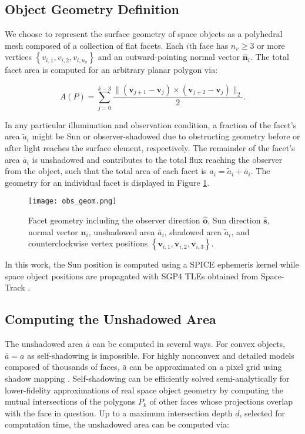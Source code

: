 \documentclass[a4paper,twocolumn]{spaceDebrisC} %
\newcommand{\vctr}[1]{\bm{#1}}
\newcommand{\unitv}[1]{\hat{\vctr{#1}}}
\newcommand{\figmed}[0]{0.35\textwidth}
\begin{document}
\subsection{Object Geometry Definition}

We choose to represent the surface geometry of space objects as a polyhedral mesh composed of a collection of flat facets. Each $i$th face has $n_v \geq 3$ or more vertices $\left\{ v_{i,1}, v_{i,2}, v_{i,n_v} \right\}$ and an outward-pointing normal vector $\unitv{n}_i$. The total facet area is computed for an arbitrary planar polygon via:

\begin{equation} \label{eq:poly_area}
 A(P) = \sum_{j=0}^{k-3} \frac{\| \left( \vctr{v}_{j+1} - \vctr{v}_{j} \right) \times \left( \vctr{v}_{j+2} - \vctr{v}_{j} \right)\|_2}{2}.
 \end{equation} 
 
 In any particular illumination and observation condition, a fraction of the facet's area $\tilde{a}_i$ might be Sun or observer-shadowed due to obstructing geometry before or after light reaches the surface element, respectively. The remainder of the facet's area $\bar{a}_i$ is unshadowed and contributes to the total flux reaching the observer from the object, such that the total area of each facet is $a_i = \tilde{a}_i + \bar{a}_i$. The geometry for an individual facet is displayed in Figure \ref{fig:facet_geom}.

\begin{figure}[H]
  \centering
  \texttt{[image: obs\_geom.png]}
  \caption{Facet geometry including the observer direction $\unitv{o}$, Sun direction $\unitv{s}$, normal vector $\unitv{n}_i$, unshadowed area $\bar{a}_i$, shadowed area $\tilde{a}_i$, and counterclockwise vertex positions $\left\{ \vctr{v}_{i,1}, \vctr{v}_{i,2}, \vctr{v}_{i,3} \right\}$.}
  \label{fig:facet_geom}
\end{figure}

In this work, the Sun position is computed using a SPICE ephemeris kernel \cite{spice} while space object positions are propagated with SGP4 TLEs obtained from Space-Track \cite{spacetrack}.

\subsection{Computing the Unshadowed Area}

The unshadowed area $\bar{a}$ can be computed in several ways. For convex objects, $\bar{a}=a$ as self-shadowing is impossible. For highly nonconvex and detailed models composed of thousands of faces, $\bar{a}$ can be approximated on a pixel grid using shadow mapping \cite{robinson2022}. Self-shadowing can be efficiently solved semi-analytically for lower-fidelity approximations of real space object geometry by computing the mutual intersections of the polygons $P_k$ of other faces whose projections overlap with the face in question. Up to a maximum intersection depth $d$, selected for computation time, the unshadowed area can be computed via:
\end{document}
